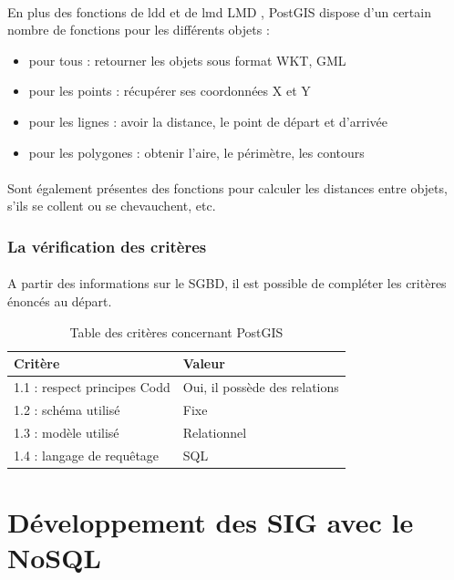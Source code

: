 \paragraph{}En plus des fonctions de \gls{ldd} et de \gls{lmd} LMD , PostGIS dispose d’un certain nombre de fonctions pour les différents objets :
\begin{itemize}[label=\textbullet]
    \item pour tous : retourner les objets sous format WKT, GML
    \item pour les points : récupérer ses coordonnées X et Y
    \item pour les lignes : avoir la distance, le point de départ et d’arrivée
    \item pour les polygones : obtenir l’aire, le périmètre, les contours
\end{itemize}
\paragraph{}Sont également présentes des fonctions pour calculer les distances entre objets, s’ils se collent ou se chevauchent, etc.

\subsubsection{La vérification des critères}
\paragraph{}A partir des informations sur le \acrshort{SGBD}, il est possible de compléter les critères énoncés au départ.
\begin{table}[h!]
    \centering
	\begin{tabular}{|p{5cm}|p{7cm}|} 
  	\hline
  	\textbf{Critère} & \textbf{Valeur} \\
  	\hline
  	1.1 : respect principes Codd & Oui, il possède des relations \\
  	\hline
  	1.2 : schéma utilisé & Fixe \\
  	\hline
  	1.3 : modèle utilisé & Relationnel \\
  	\hline
  	1.4 : langage de requêtage & SQL \\
  	\hline
	\end{tabular}
    \caption{Table des critères concernant PostGIS}
    \label{tab:critere-postgis}
\end{table}

\section{Développement des SIG avec le NoSQL}
